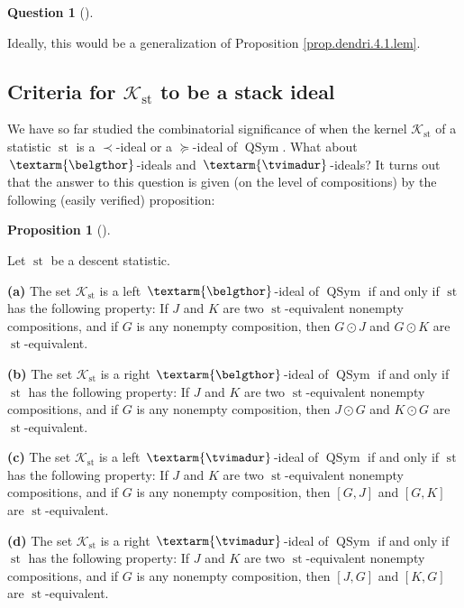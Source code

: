 \documentclass[numbers=enddot,12pt,final,onecolumn,notitlepage]{scrartcl}%
\theoremstyle{definition}
\newtheorem{prop}[theo]{Proposition}
\newenvironment{proposition}[1][]
{\begin{prop}[#1]\begin{leftbar}}
{\end{leftbar}\end{prop}}
\newtheorem{quest}[theo]{Question}
\newenvironment{question}[1][]
{\begin{quest}[#1]\begin{leftbar}}
{\end{leftbar}\end{quest}}
\newenvironment{question}[1][Question]{\noindent\textbf{#1.} }{\ \rule{0.5em}{0.5em}}
\newenvironment{verlong}{}{}
\newcommand{\tvi}{\left. \textarm{\tvimadur} \right.}
\newcommand{\bel}{\left. \textarm{\belgthor} \right.}
\begin{document}
\begin{verlong}
\begin{question}
Ideally, this would be a generalization of Proposition
\ref{prop.dendri.4.1.lem}.
\end{question}

\subsection{Criteria for $\mathcal{K}_{\operatorname{st}}$ to be a stack
ideal}

We have so far studied the combinatorial significance of when the kernel
$\mathcal{K}_{\operatorname{st}}$ of a statistic $\operatorname{st}$ is a
$\left.  \prec\right.  $-ideal or a $\left.  \succeq\right.  $-ideal of
$\operatorname*{QSym}$. What about $\bel$-ideals and $\tvi$-ideals? It turns
out that the answer to this question is given (on the level of compositions)
by the following (easily verified) proposition:

\begin{proposition}
\label{prop.bel-tvi-comp}Let $\operatorname{st}$ be a descent statistic.

\textbf{(a)} The set $\mathcal{K}_{\operatorname{st}}$ is a left $\bel$-ideal
of $\operatorname*{QSym}$ if and only if $\operatorname{st}$ has the
following property: If $J$ and $K$ are two $\operatorname{st}$-equivalent
nonempty compositions, and if $G$ is any nonempty composition, then $G\odot J$
and $G\odot K$ are $\operatorname{st}$-equivalent.

\textbf{(b)} The set $\mathcal{K}_{\operatorname{st}}$ is a right
$\bel$-ideal of $\operatorname*{QSym}$ if and only if $\operatorname{st}$ has
the following property: If $J$ and $K$ are two $\operatorname{st}$-equivalent
nonempty compositions, and if $G$ is any nonempty composition, then $J\odot G$
and $K\odot G$ are $\operatorname{st}$-equivalent.

\textbf{(c)} The set $\mathcal{K}_{\operatorname{st}}$ is a left $\tvi$-ideal
of $\operatorname*{QSym}$ if and only if $\operatorname{st}$ has the
following property: If $J$ and $K$ are two $\operatorname{st}$-equivalent
nonempty compositions, and if $G$ is any nonempty composition, then $\left[
G,J\right]  $ and $\left[  G,K\right]  $ are $\operatorname{st}$-equivalent.

\textbf{(d)} The set $\mathcal{K}_{\operatorname{st}}$ is a right
$\tvi$-ideal of $\operatorname*{QSym}$ if and only if $\operatorname{st}$ has
the following property: If $J$ and $K$ are two $\operatorname{st}$-equivalent
nonempty compositions, and if $G$ is any nonempty composition, then $\left[
J,G\right]  $ and $\left[  K,G\right]  $ are $\operatorname{st}$-equivalent.
\end{proposition}


\end{verlong}
\end{document}
